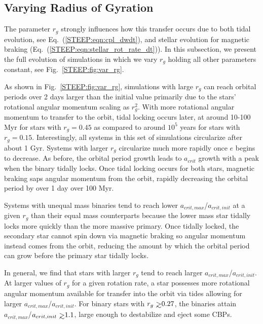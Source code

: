 \subsection{Varying Radius of Gyration} \label{STEEP:sec:var_rg}

The parameter $r_g$ strongly influences how this transfer occurs due to both tidal evolution, see Eq.~(\ref{STEEP:eqn:cpl_dwdt}), and stellar evolution for magnetic braking (Eq.~(\ref{STEEP:eqn:stellar_rot_rate_dt})).  In this subsection, we present the full evolution of simulations in which we vary $r_g$ holding all other parameters constant, see Fig.~\ref{STEEP:fig:var_rg}.

As shown in Fig.~\ref{STEEP:fig:var_rg}, simulations with large $r_g$ can reach orbital periods over 2 days larger than the initial value primarily due to the stars' rotational angular momentum scaling as $r_g^2$.  With more rotational angular momentum to transfer to the orbit, tidal locking occurs later, at around 10-100 Myr for stars with $r_g=0.45$ as compared to around $10^5$ years for stars with $r_g=0.15$.  Interestingly, all systems in this set of simulations circularize after about 1 Gyr.  Systems with larger $r_g$ circularize much more rapidly once $e$ begins to decrease.  As before, the orbital period growth leads to $a_{crit}$ growth with a peak when the binary tidally locks.  Once tidal locking occurs for both stars, magnetic braking saps angular momentum from the orbit, rapidly decreasing the orbital period by over 1 day over 100 Myr.

Systems with unequal mass binaries tend to reach lower $a_{crit,max}$/$a_{crit,init}$ at a given $r_g$ than their equal mass counterparts because the lower mass star tidally locks more quickly than the more massive primary.  Once tidally locked, the secondary star cannot spin down via magnetic braking so angular momentum instead comes from the orbit, reducing the amount by which the orbital period can grow before the primary star tidally locks.

In general, we find that stars with larger $r_g$ tend to reach larger $a_{crit,max}$/$a_{crit,init}$.  At larger values of $r_g$ for a given rotation rate, a star possesses more rotational angular momentum available for transfer into the orbit via tides allowing for larger $a_{crit,max}$/$a_{crit,init}$.  For binary stars with $r_g \gsim 0.27$, the binaries attain $a_{crit,max}$/$a_{crit,init} \gsim 1.1$, large enough to destabilize and eject some CBPs.  

